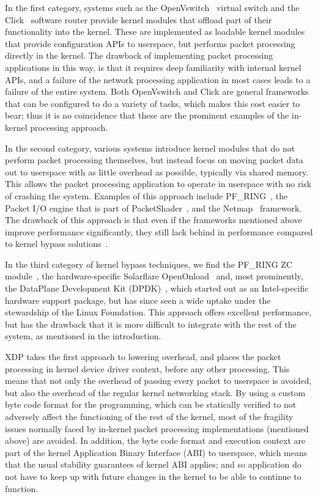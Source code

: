 \documentclass[10pt,sigconf]{acmart}
\begin{document}
In the first category, systems such as the OpenVswitch~\cite{openvswitch}
virtual switch and the Click~\cite{martins2014clickos} software router provide
kernel modules that offload part of their functionality into the kernel. These
are implemented as loadable kernel modules that provide configuration APIs to
userspace, but performs packet processing directly in the kernel. The drawback
of implementing packet processing applications in this way, is that it requires
deep familiarity with internal kernel APIs, and a failure of the network
processing application in most cases leads to a failure of the entire system.
Both OpenVswitch and Click are general frameworks that can be configured to do a
variety of tasks, which makes this cost easier to bear; thus it is no
coincidence that these are the prominent examples of the in-kernel processing
approach.

In the second category, various systems introduce kernel modules that do not
perform packet processing themselves, but instead focus on moving packet data
out to userspace with as little overhead as possible, typically via shared
memory. This allows the packet processing application to operate in userspace
with no risk of crashing the system. Examples of this approach include
PF\_RING~\cite{deri2009modern}, the Packet I/O engine that is part of
PacketShader~\cite{han2010packetshader}, and the Netmap~\cite{rizzo2012netmap}
framework. The drawback of this approach is that even if the frameworks
mentioned above improve performance significantly, they still lack behind in
performance compared to kernel bypass
solutions~\cite{gallenmuller_comparison_2015}.

In the third category of kernel bypass techniques, we find the PF\_RING ZC
module~\cite{pfringzc}, the hardware-specific Solarflare
OpenOnload~\cite{openonload} and, most prominently, the DataPlane Development
Kit (DPDK)~\cite{dpdk}, which started out as an Intel-specific hardware support
package, but has since seen a wide uptake under the stewardship of the Linux
Foundation. This approach offers excellent performance, but has the drawback
that it is more difficult to integrate with the rest of the system, as mentioned
in the introduction.

XDP takes the first approach to lowering overhead, and places the packet
processing in kernel device driver context, before any other processing. This
means that not only the overhead of passing every packet to userspace is
avoided, but also the overhead of the regular kernel networking stack. By using
a custom byte code format for the programming, which can be statically verified
to not adversely affect the functioning of the rest of the kernel, most of the
fragility issues normally faced by in-kernel packet processing implementations
(mentioned above) are avoided. In addition, the byte code format and execution
context are part of the kernel Application Binary Interface (ABI) to userspace,
which means that the usual stability guarantees of kernel ABI applies; and so
application do not have to keep up with future changes in the kernel to be able
to continue to function.
\end{document}
